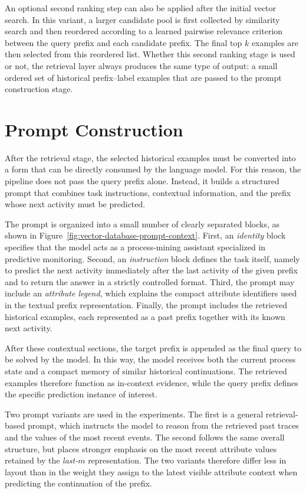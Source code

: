 \indent An optional second ranking step can also be applied after the initial
vector search. In this variant, a larger candidate pool is first collected by
similarity search and then reordered according to a learned pairwise relevance
criterion between the query prefix and each candidate prefix. The final top
\(k\) examples are then selected from this reordered list. Whether this second
ranking stage is used or not, the retrieval layer always produces the same
type of output: a small ordered set of historical prefix--label examples that
are passed to the prompt construction stage.

\section{Prompt Construction}
After the retrieval stage, the selected historical examples must be converted
into a form that can be directly consumed by the language model. For this
reason, the pipeline does not pass the query prefix alone. Instead, it builds
a structured prompt that combines task instructions, contextual information,
and the prefix whose next activity must be predicted.

\indent The prompt is organized into a small number of clearly separated
blocks, as shown in Figure~\ref{fig:vector-database-prompt-context}. First, an
\textit{identity} block specifies that the model acts as a
process-mining assistant specialized in predictive monitoring. Second, an
\textit{instruction} block defines the task itself, namely to predict the next
activity immediately after the last activity of the given prefix and to return
the answer in a strictly controlled format. Third, the prompt may include an
\textit{attribute legend}, which explains the compact attribute identifiers
used in the textual prefix representation. Finally, the prompt includes the
retrieved historical examples, each represented as a past prefix together with
its known next activity.

\indent After these contextual sections, the target prefix is appended as the
final query to be solved by the model. In this way, the model receives both
the current process state and a compact memory of similar historical
continuations. The retrieved examples therefore function as in-context
evidence, while the query prefix defines the specific prediction instance of
interest.

\indent Two prompt variants are used in the experiments. The first is a general
retrieval-based prompt, which instructs the model to reason from the retrieved
past traces and the values of the most recent events. The second follows the
same overall structure, but places stronger emphasis on the most recent
attribute values retained by the \textit{last-\(m\)} representation. The two
variants therefore differ less in layout than in the weight they assign to the
latest visible attribute context when predicting the continuation of the
prefix.

